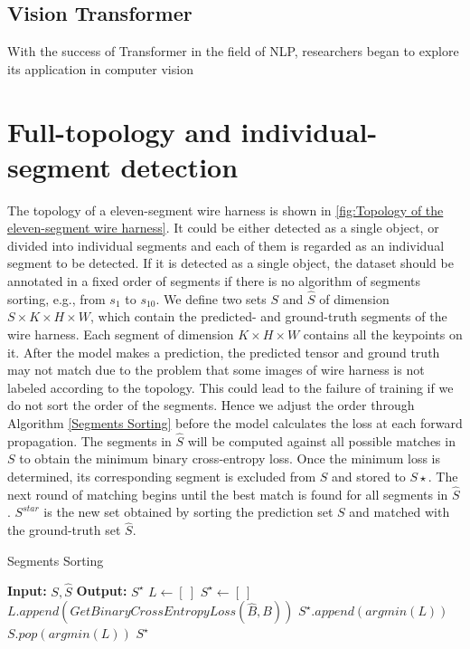 \subsection{Vision Transformer}
  With the success of Transformer in the field of NLP, researchers began to explore its application in computer vision
\section{Full-topology and individual-segment detection}
 The topology of a eleven-segment wire harness is shown in \autoref{fig:Topology of the eleven-segment wire harness}. It could be either detected as a single
 object, or divided into individual segments and each of them is regarded as an individual segment to be detected. If it is detected as a single object, 
 the dataset should be annotated in a fixed order of segments if there is no algorithm of segments sorting, e.g., from $s_1$ to $s_10$. 
 We define two sets $S$ and $\hat{S}$ of dimension $S \times K \times H \times W$, which contain the predicted- and ground-truth segments of the wire harness. 
 Each segment of dimension $K\times H\times W$ contains all the keypoints on it. After the model makes a prediction, the predicted tensor and ground truth may 
 not match due to the problem that some images of wire harness is not labeled according to the topology. This could lead to the failure of training if we do not 
 sort the order of the segments. Hence we adjust the order through Algorithm \ref{Segments Sorting} before the model calculates the loss at each forward propagation. 
 The segments in $\hat{S}$ will be computed against all possible matches in $S$ to obtain the minimum binary cross-entropy loss. Once the minimum loss is determined, 
 its corresponding segment is excluded from $S$ and stored to $S\star$. The next round of matching begins until the best match is found for all segments in $\hat{S}$. 
 $S^{star}$ is the new set obtained by sorting the prediction set $S$ and matched with the ground-truth set $\hat{S}$.
 \begin{algorithm} 
  \caption{Segments Sorting}
  \label{Segments Sorting}
  \begin{algorithmic}
  \STATE \textbf{Input:} $S, \hat{S}$
  \STATE \textbf{Output:} $S^{\star}$
  \STATE $ L\leftarrow \left [\ \right ] $
  \STATE $ S^{\star}\leftarrow \left [\ \right ] $
          \STATE $L.append(GetBinaryCrossEntropyLoss(\hat{B},B))$
      \ENDFOR
      \STATE $S^{\star}.append({argmin(L)})$
      \STATE $S.pop({argmin(L)})$
  \ENDFOR
  \RETURN $S^{\star}$
  \end{algorithmic}
\end{algorithm}

